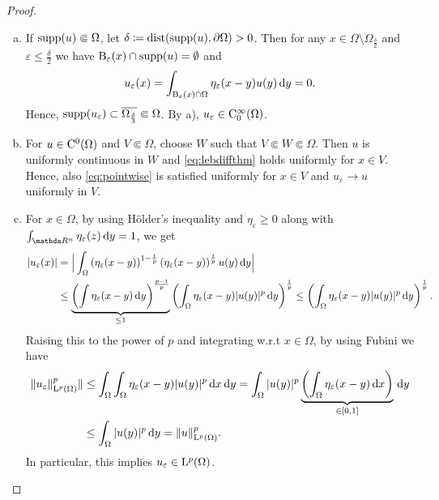\begin{proof}
\begin{enumerate}[a)]
    \item If $\operatorname{supp}(u) \Subset \Omega$, let $\delta \coloneqq \operatorname{dist}(\operatorname{supp}(u), \partial \Omega) > 0$.
    Then for any $x \in \Omega \setminus \Omega_{\frac{\delta}{2}}$ and $\varepsilon \leq \frac{\delta}{2}$ we have $\mathrm{B}_\varepsilon(x) \cap \operatorname{supp}(u) = \emptyset$ and 
    $$
    u_\varepsilon(x) = \int_{\mathrm{B}_\varepsilon(x) \cap \Omega} \eta_\varepsilon(x - y) u(y) \, {\operatorname{d}\!{y}} = 0.
    $$
    Hence, $\operatorname{supp}(u_\varepsilon) \subset \overline{\Omega_{\frac{\delta}{3}}} \Subset \Omega$.
    By a), $u_\varepsilon \in \mathrm{C}_0^\infty(\Omega)$.

    \item For $u \in \mathrm{C}^0(\Omega)$ and $V \Subset \Omega$, choose $W$ such that $V \Subset W \Subset \Omega$.
    Then $u$ is uniformly continuous in $W$ and \eqref{eq:lebdiffthm} holds uniformly for $x \in V$.
    Hence, also \eqref{eq:pointwise} is satisfied uniformly for $x \in V$ and $u_\varepsilon \to u$ uniformly in $V$.

    \item For $x \in \Omega$, by using Hölder's inequality and $\eta_\varepsilon \geq 0$ along with $\int_{\R^n} \eta_\varepsilon(z) \d y = 1$, we get
    \begin{align*}
      |u_\varepsilon(x)| 
      &= \Big| \int_\Omega \left( \eta_\varepsilon(x - y) \right)^{1 - \frac{1}{p}} \left( \eta_\varepsilon(x - y)\right)^{\frac{1}{p}} u(y) \, {\operatorname{d}\!{y}} \Big| \\
      &\leq \underbrace{\left( \int \eta_\varepsilon(x -y) \, {\operatorname{d}\!{y}}\right)^{\frac{p - 1}{p}}}_{\leq 1} \left( \int_\Omega \eta_\varepsilon(x - y) |u(y)|^p \, {\operatorname{d}\!{y}} \right)^\frac{1}{p}
      \leq \left( \int_\Omega \eta_\varepsilon (x - y) |u(y)|^p \, {\operatorname{d}\!{y}} \right)^{\frac{1}{p}}.
    \end{align*}
    Raising this to the power of $p$ and integrating w.r.t $x \in \Omega$, by using Fubini we have
    \begin{align}
      \|u_\varepsilon\|_{\mathrm{L}^p(\Omega)}^p \|
      &\leq \int_\Omega\int_\Omega \eta_\varepsilon(x - y) |u(y)|^p \, {\operatorname{d}\!{x}} \, {\operatorname{d}\!{y}}
      = \int_\Omega |u(y)|^p \underbrace{\left( \int_\Omega \eta_\varepsilon(x -y) \, {\operatorname{d}\!{x}} \right)}_{\in [0,1]} \, {\operatorname{d}\!{y}} \nonumber\\
      &\leq \int_\Omega |u(y)|^p \, {\operatorname{d}\!{y}} = \|u\|_{\mathrm{L}^p(\Omega)}^p.
      \label{eq:lpinequality}
    \end{align}
    In particular, this implies $u_\varepsilon \in \mathrm{L}^p(\Omega)$.


\end{enumerate}
\end{proof}

